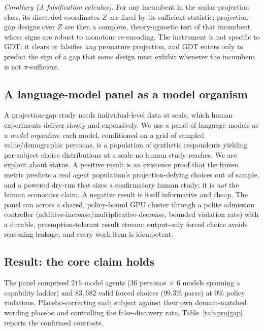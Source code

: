 \documentclass[journal]{IEEEtran}
\begin{document}
\emph{Corollary (A falsification calculus).}
For any incumbent in the scalar-projection class, its discarded coordinates $Z$ are fixed by its sufficient statistic; projection-gap designs over $Z$ are then a complete, theory-agnostic test of that incumbent whose signs are robust to monotone re-encoding.
The instrument is not specific to GDT: it clears or falsifies \emph{any} premature projection, and GDT enters only to predict the sign of a gap that some design must exhibit whenever the incumbent is not $\pi$-sufficient.

\subsection{A language-model panel as a model organism}
A projection-gap study needs individual-level data at scale, which human experiments deliver slowly and expensively.
We use a panel of language models as a \emph{model organism}: each model, conditioned on a grid of sampled value/demographic personas, is a population of synthetic respondents yielding per-subject choice distributions at a scale no human study reaches.
We are explicit about status.
A positive result is an existence proof that the frozen metric predicts a real agent population's projection-defying choices out of sample, and a powered dry-run that sizes a confirmatory human study; it is \emph{not} the human economics claim.
A negative result is itself informative and cheap.
The panel ran across a shared, policy-bound GPU cluster through a polite admission controller (additive-increase/multiplicative-decrease, bounded violation rate) with a durable, preemption-tolerant result stream; output-only forced choice avoids reasoning leakage, and every work item is idempotent.

\subsection{Result: the core claim holds}
The panel comprised $216$ model agents ($36$ personas $\times$ $6$ models spanning a capability ladder) and $83{,}682$ valid forced choices ($99.3\%$ parse) at $0\%$ policy violations.
Placebo-correcting each subject against their own domain-matched wording placebo and controlling the false-discovery rate, Table~\ref{tab:projgap} reports the confirmed contrasts.
\end{document}
